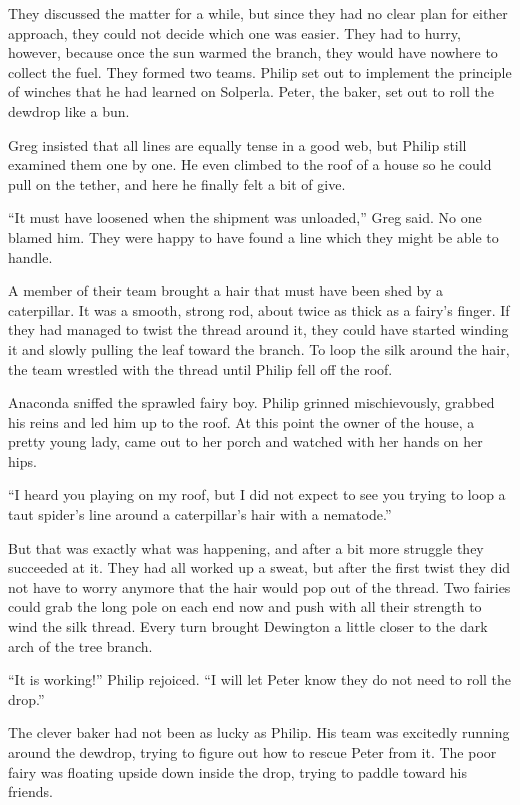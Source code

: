 \documentclass[10pt, draft]{memoir}
\begin{document}
They discussed the matter for a while, but since they had no clear plan for either approach, they could not decide which one was easier. They had to hurry, however, because once the sun warmed the branch, they would have nowhere to collect the fuel. They formed two teams. Philip set out to implement the principle of winches that he had learned on Solperla. Peter, the baker, set out to roll the dewdrop like a bun.

Greg insisted that all lines are equally tense in a good web, but Philip still examined them one by one. He even climbed to the roof of a house so he could pull on the tether, and here he finally felt a bit of give.

``It must have loosened when the shipment was unloaded,'' Greg said. No one blamed him. They were happy to have found a line which they might be able to handle.

A member of their team brought a hair that must have been shed by a caterpillar. It was a smooth, strong rod, about twice as thick as a fairy's finger. If they had managed to twist the thread around it, they could have started winding it and slowly pulling the leaf toward the branch. To loop the silk around the hair, the team wrestled with the thread until Philip fell off the roof.

Anaconda sniffed the sprawled fairy boy. Philip grinned mischievously, grabbed his reins and led him up to the roof. At this point the owner of the house, a pretty young lady, came out to her porch and watched with her hands on her hips.

``I heard you playing on my roof, but I did not expect to see you trying to loop a taut spider's line around a caterpillar's hair with a nematode.''

But that was exactly what was happening, and after a bit more struggle they succeeded at it. They had all worked up a sweat, but after the first twist they did not have to worry anymore that the hair would pop out of the thread. Two fairies could grab the long pole on each end now and push with all their strength to wind the silk thread. Every turn brought Dewington a little closer to the dark arch of the tree branch.

``It is working!'' Philip rejoiced. ``I will let Peter know they do not need to roll the drop.''

The clever baker had not been as lucky as Philip. His team was excitedly running around the dewdrop, trying to figure out how to rescue Peter from it. The poor fairy was floating upside down inside the drop, trying to paddle toward his friends.
\end{document}
